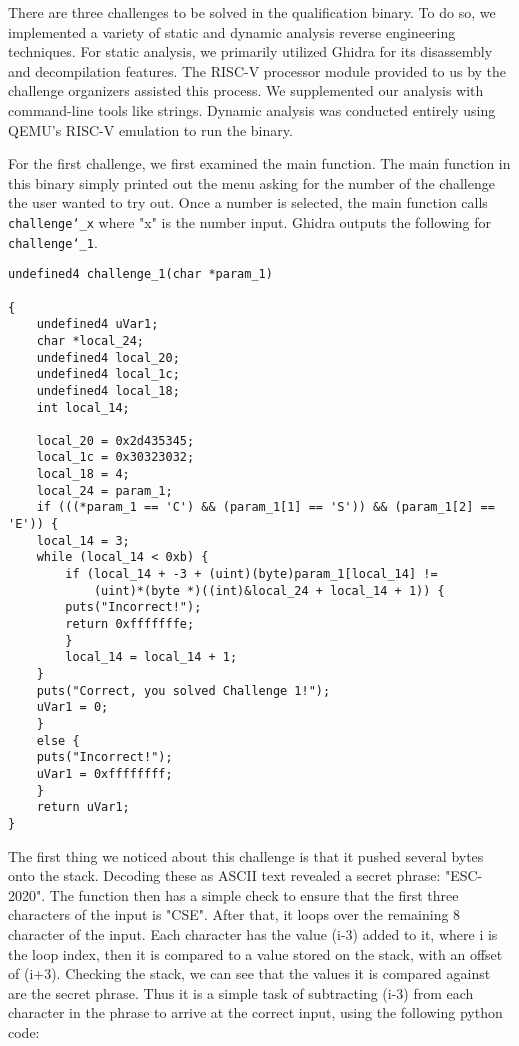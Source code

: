 There are three challenges to be solved in the qualification binary. To do so, we implemented a variety of static and dynamic analysis reverse engineering techniques. For static analysis, we primarily utilized Ghidra for its disassembly and decompilation features. The RISC-V processor module provided to us by the challenge organizers assisted this process. We supplemented our analysis with command-line tools like strings. Dynamic analysis was conducted entirely using QEMU's RISC-V emulation to run the binary. 

For the first challenge, we first examined the main function. The main function in this binary simply printed out the menu asking for the number of the challenge the user wanted to try out. Once a number is selected, the main function calls \texttt{challenge\char`_x} where "x" is the number input. Ghidra outputs the following for \texttt{challenge\char`_1}.

\begin{lstlisting}
undefined4 challenge_1(char *param_1)

{
	undefined4 uVar1;
	char *local_24;
	undefined4 local_20;
	undefined4 local_1c;
	undefined4 local_18;
	int local_14;
	
	local_20 = 0x2d435345;
	local_1c = 0x30323032;
	local_18 = 4;
	local_24 = param_1;
	if (((*param_1 == 'C') && (param_1[1] == 'S')) && (param_1[2] == 'E')) {
	local_14 = 3;
	while (local_14 < 0xb) {
		if (local_14 + -3 + (uint)(byte)param_1[local_14] !=
			(uint)*(byte *)((int)&local_24 + local_14 + 1)) {
		puts("Incorrect!");
		return 0xfffffffe;
		}
		local_14 = local_14 + 1;
	}
	puts("Correct, you solved Challenge 1!");
	uVar1 = 0;
	}
	else {
	puts("Incorrect!");
	uVar1 = 0xffffffff;
	}
	return uVar1;
}
\end{lstlisting}

The first thing we noticed about this challenge is that it pushed several bytes onto the stack. Decoding these as ASCII text revealed a secret phrase: "ESC-2020". The function then has a simple check to ensure that the first three characters of the input is "CSE". After that, it loops over the remaining 8 character of the input. Each character has the value (i-3) added to it, where i is the loop index, then it is compared to a value stored on the stack, with an offset of (i+3). Checking the stack, we can see that the values it is compared against are the secret phrase. Thus it is a simple task of subtracting (i-3) from each character in the phrase to arrive at the correct input, using the following python code:

